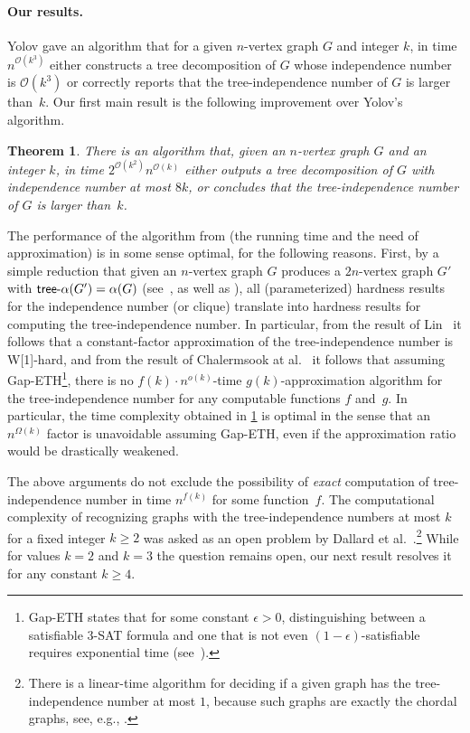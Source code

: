 \documentclass[11pt]{article}
\newtheorem{theorem}{Theorem}[section]
\theoremstyle{definition}
\newcommand{\tin}{\mathsf{tree} \textnormal{-} \alpha}
\newcommand{\OO}{\mathcal{O}}
\newcommand{\W}{\textup{\textsf{W[1]}}}
\begin{document}
\paragraph{Our results.}
Yolov \cite{Yolov18} gave an algorithm that for a given $n$-vertex graph $G$ and integer $k$, in time
$n^{\OO(k^3)}$ either constructs a tree decomposition of $G$ whose independence number is $\OO(k^3)$ or correctly reports that the tree-independence number of $G$ is larger than~$k$.
Our first main result is the following improvement over Yolov's algorithm.


\begin{theorem}
\label{the:main_alg}
There is an algorithm that, given an $n$-vertex graph $G$ and an integer $k$, in time $2^{\OO(k^2)} n^{\OO(k)}$ either outputs a tree decomposition of $G$ with independence number at most $8k$, or concludes that the tree-independence number of $G$ is larger than~$k$.
\end{theorem}


The performance of the algorithm from    (the running time and the need of approximation) is in some sense optimal, for the following reasons.
First,  by a simple reduction that given an $n$-vertex graph $G$ produces a $2n$-vertex graph $G'$ with $\tin(G') = \alpha(G)$ (see~\cite{DallardMS24}, as well as ), all (parameterized) hardness results for the independence number (or clique) translate into hardness results for computing the tree-independence number.
In particular, from the result of Lin~\cite{Lin21} it follows that a constant-factor approximation of the tree-independence number is \W-hard, and from the result of Chalermsook at al.~\cite{DBLP:journals/siamcomp/ChalermsookCKLM20} it follows that assuming Gap-ETH\footnote{Gap-ETH states that for some constant $\epsilon > 0$, distinguishing between a satisfiable 3-\textsf{SAT} formula and one that is not even $(1-\epsilon)$-satisfiable requires exponential time (see~\cite{DBLP:conf/icalp/ManurangsiR17,DBLP:journals/eccc/Dinur16}).}, there is no $f(k) \cdot n^{o(k)}$-time $g(k)$-approximation algorithm for the tree-independence number for any computable functions $f$ and~$g$.
In particular, the time complexity obtained in \cref{the:main_alg} is optimal in the sense that an $n^{\Omega(k)}$ factor is unavoidable assuming Gap-ETH, even if the approximation ratio would be drastically weakened.

The above arguments do not exclude the possibility of  \emph{exact} computation of tree-independence number in time $n^{f(k)}$ for some function~$f$.
The computational complexity  of recognizing graphs with the tree-independence numbers at most $k$ for a fixed integer $k \geq 2$ was asked as an open problem by Dallard et al.~\cite[Question~8.3]{DallardMS24}.\footnote{There is a linear-time algorithm for deciding if a given graph has the tree-independence number at most $1$, because such graphs are exactly the chordal graphs, see, e.g., \cite{Golumbic80}.}
While for values $k=2$ and $k=3$ the question remains open,  our next result resolves it for any constant $k\geq 4$.
\end{document}
